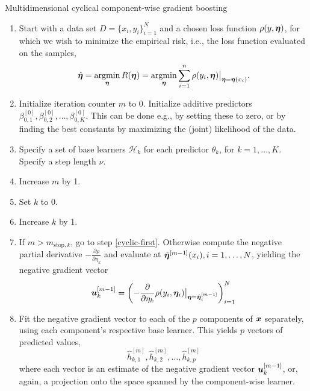 \begin{algorithm}
\caption{Multidimensional cyclical component-wise gradient boosting}
\label{algo:multi-cyclical}
\begin{enumerate}
    \item Start with a data set $D=\{x_i, y_i\}_{i=1}^N$ and a chosen loss function $\rho(y,\boldsymbol{\eta})$, for which we wish to
        minimize the empirical risk, i.e., the loss function evaluated on the samples,
        \begin{equation}
            \hat{\boldsymbol{\eta}}=\operatorname*{argmin}_{\boldsymbol{\eta}}R(\boldsymbol{\eta})=\operatorname*{argmin}_{\boldsymbol{\eta}}\sum_{i=1}^n \rho(y_i,\boldsymbol{\eta})\big\rvert_{\boldsymbol{\eta}=\boldsymbol{\eta}(x_i)}.
        \end{equation}
    \item Initialize iteration counter $m$ to 0. Initialize additive predictors $\beta_{0,1}^{[0]},\beta_{0,2}^{[0]},\ldots,\beta_{0,K}^{[0]}$. This can be done e.g., by setting these to zero, or by finding the best constants by maximizing the (joint) likelihood of the data.
    \item\label{initialization} Specify a set of base learners $\mathcal{H}_k$ for each predictor $\theta_k$, for $k=1,\ldots,K$. Specify a step length $\nu$.
    \item Increase $m$ by 1.
    \item Set $k$ to 0.
    \item\label{cyclic-first} Increase $k$ by 1.
    \item If $m>m_{\text{stop},k}$, go to step \ref{cyclic-first}. Otherwise compute the negative partial derivative
        $-\frac{\partial\rho}{\partial \eta_k}$ and evaluate at $\hat{\boldsymbol{\eta}}^{[m-1]}(x_i),i=1,\ldots,N$, yielding the
        negative gradient vector
        \begin{equation}
            \bm{u}^{[m-1]}_k=\left(-\frac{\partial}{\partial \eta_k}\rho(y_i, \boldsymbol{\eta}_i)\big\rvert_{\boldsymbol{\eta}=\hat{\boldsymbol{\eta}}_{i}^{[m-1]}}\right)_{i=1}^N
        \end{equation}
    \item Fit the negative gradient vector to each of the $p$ components of $\bm{x}$ separately, using each component's respective base learner. This yields $p$ vectors of predicted values,
        \begin{equation}
            \hat{h}_{k,1}^{[m]},\hat{h}_{k,2}^{[m]},\ldots,\hat{h}_{k,p}^{[m]}
        \end{equation}
        where each vector is an estimate of the negative gradient vector $\bm{u}^{[m-1]}_k$, or, again, a projection onto the space spanned by the component-wise learner.

\end{enumerate}
\end{algorithm}
